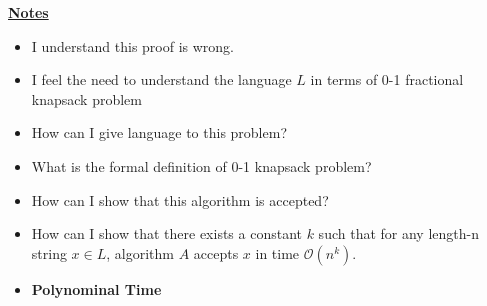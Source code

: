\documentclass[12pt]{article}
\begin{document}
\begin{enumerate}[1.]














    \underline{\textbf{Notes}}

    \begin{itemize}
        \item I understand this proof is wrong.
        \item I feel the need to understand the language $L$ in terms of 0-1 fractional knapsack problem
        \item How can I give language to this problem?
        \item What is the formal definition of 0-1 knapsack problem?
        \item How can I show that this algorithm is accepted?
        \item How can I show that there exists a constant $k$ such that for any
        length-n string $x \in L$, algorithm $A$ accepts $x$ in time $\mathcal{O}(n^k)$.
        \item \textbf{Polynominal Time}


\end{itemize}
\end{enumerate}
\end{document}
